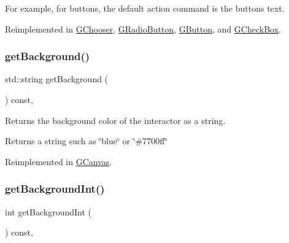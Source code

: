 For example, for buttons, the default action command is the button\textquotesingle{}s text. 

Reimplemented in \mbox{\hyperlink{classGChooser_a4f83505141da1f8446f0e0e0a9507930}{G\+Chooser}}, \mbox{\hyperlink{classGRadioButton_a4f83505141da1f8446f0e0e0a9507930}{G\+Radio\+Button}}, \mbox{\hyperlink{classGButton_a4f83505141da1f8446f0e0e0a9507930}{G\+Button}}, and \mbox{\hyperlink{classGCheckBox_a4f83505141da1f8446f0e0e0a9507930}{G\+Check\+Box}}.

\mbox{\label{classGInteractor_a808e22cc1fdfbecf71ed8c64ef4600e0}} 
\subsubsection{\texorpdfstring{get\+Background()}{getBackground()}}
{\footnotesize\ttfamily std\+::string get\+Background (\begin{DoxyParamCaption}{ }\end{DoxyParamCaption}) const\hspace{0.3cm}{\ttfamily [virtual]}, {\ttfamily [inherited]}}



Returns the background color of the interactor as a string. 

\begin{DoxyReturn}{Returns}
a string such as \char`\"{}blue\char`\"{} or \char`\"{}\#7700ff\char`\"{} 
\end{DoxyReturn}


Reimplemented in \mbox{\hyperlink{classGCanvas_a4a62c51b7244a7642b88065e3a07ae82}{G\+Canvas}}.

\mbox{\label{classGInteractor_a9e827257a55cb8cf4d9de2ec6bcfd7a0}} 
\subsubsection{\texorpdfstring{get\+Background\+Int()}{getBackgroundInt()}}
{\footnotesize\ttfamily int get\+Background\+Int (\begin{DoxyParamCaption}{ }\end{DoxyParamCaption}) const\hspace{0.3cm}{\ttfamily [virtual]}, {\ttfamily [inherited]}}



